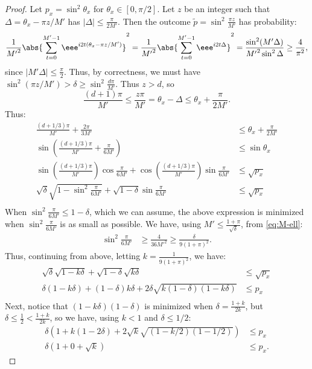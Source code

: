 \documentclass{toc}
\begin{document}
\begin{proof}
Let $p_x=\sin^2\theta_x$ for $\theta_x\in [0,\pi/2]$. Let $z$ be an integer such that $\Delta=\theta_x-\pi z/M'$ has $|\Delta|\leq \frac{\pi}{2M'}$. Then the outcome $\tilde p = \sin^2\frac{\pi z}{M'}$ has probability:
$$\frac{1}{{M'}^2}\abs{\sum_{t=0}^{M'-1}\eee^{i2t(\theta_x-\pi z/M')}}^2=\frac{1}{{M'}^2}\abs{\sum_{t=0}^{M'-1}\eee^{i2 t\Delta}}^2=\frac{\sin^2(M'\Delta)}{{M'}^2\sin^2\Delta}\geq \frac{4}{\pi^2},$$
since $|M'\Delta|\leq \frac{\pi}{2}$. Thus, by correctness, we must have $\sin^2(\pi z/M')> \delta\geq \sin^2\frac{d\pi}{M'}$. Thus $z>d$, so 
$$\frac{(d+1)\pi}{M'}\leq \frac{z\pi}{M'}=\theta_x-\Delta\leq \theta_x+\frac{\pi}{2M'}.$$
Thus:
\begin{align*}
\frac{(d+1/3)\pi}{M'}+\frac{2\pi}{3M'} & \leq \theta_x+\frac{\pi}{2M'}\\
\sin\left(\frac{(d+1/3)\pi}{M'}+\frac{\pi}{6M'}\right) &\leq \sin\theta_x\\
\sin\left(\frac{(d+1/3)\pi}{M'}\right)\cos\frac{\pi}{6M'}+\cos\left(\frac{(d+1/3)\pi}{M'}\right)\sin\frac{\pi}{6M'} &\leq \sqrt{p_x}\\
\sqrt{\delta}\sqrt{1-\sin^2\frac{\pi}{6M'}}+\sqrt{1-\delta}\sin\frac{\pi}{6M'} &\leq \sqrt{p_x}\\
\end{align*}
When $\sin^2\frac{\pi}{6M'}\leq 1-\delta$, which we can assume, the above expression is minimized when $\sin^2\frac{\pi}{6M'}$ is as small as possible.
We have, using $M'\leq \frac{1+\pi}{\sqrt{\delta}}$, from \eqref{eq:M-ell}:
\begin{align*}
\sin^2\frac{\pi}{6M'} &\geq \frac{4}{36{M'}^2}\geq \frac{\delta}{9(1+\pi)^2}.
\end{align*}
Thus, continuing from above, letting $k=\frac{1}{9(1+\pi)^2}$, we have:
\begin{align*}
\sqrt{\delta}\sqrt{1-k\delta}+\sqrt{1-\delta}\sqrt{k\delta} &\leq \sqrt{p_x}\\
\delta(1-k\delta)+(1-\delta)k\delta+2\delta\sqrt{k (1-\delta)(1-k\delta)} &\leq p_x\\
\end{align*}
Next, notice that $(1-k\delta)(1-\delta)$ is minimized when $\delta=\frac{1+k}{2k}$, but $\delta\leq \frac{1}{2} < \frac{1+k}{2k}$, so we have, using $k<1$ and $\delta\leq 1/2$:
\begin{align*}
\delta(1+k(1-2\delta)+2\sqrt{k}\sqrt{(1-k/2)(1-1/2)}) &\leq p_x\\
\delta(1+0+\sqrt{k}) &\leq p_x.
\end{align*}





\end{proof}
\end{document}
